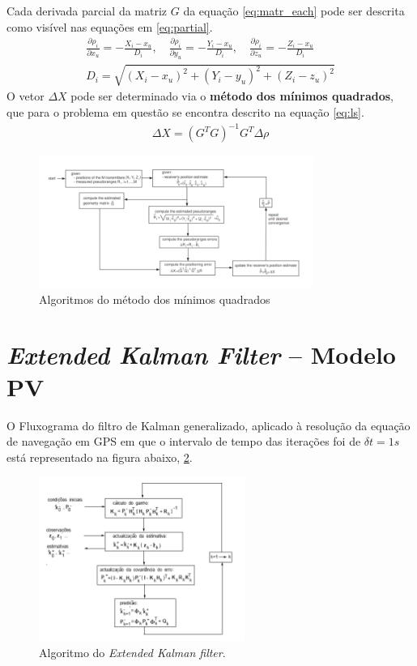 \documentclass[palatino]{ist-report}
\begin{document}
Cada derivada parcial da matriz $G$ da equação \ref{eq:matr_each} pode ser descrita como visível nas equações em \ref{eq:partial}.
\begin{subequations}
\begin{gather}\label{eq:partial}
    \frac{\partial\rho_i}{\partial x_u} = -\frac{X_i - x_u}{D_i}, \quad \frac{\partial\rho_i}{\partial y_u} = -\frac{Y_i - x_u}{D_i}, \quad \frac{\partial\rho_i}{\partial z_u} = -\frac{Z_i - x_u}{D_i} \\
    D_i = \sqrt{(X_i - x_u)^2 + (Y_i - y_u)^2 + (Z_i - z_u)^2}
\end{gather}
\end{subequations}
O vetor $\Delta X$ pode ser determinado via o \textbf{método dos mínimos quadrados}, que para o problema em questão se encontra descrito na equação \ref{eq:ls}.
\begin{gather*}\label{eq:ls}
    \Delta X = \left(G^TG\right)^{-1}G^T\Delta\rho
\end{gather*}


\begin{figure}[ht]
	\centering
	\includegraphics[width=0.8\textwidth]{graphics/minimosquadrados.png}
	\caption{Algoritmos do método dos mínimos quadrados}
	\label{LS}
\end{figure}




\section{\textit{Extended Kalman Filter} -- Modelo PV}

O Fluxograma do filtro de Kalman generalizado, aplicado à resolução da equação de navegação em GPS em que o intervalo de tempo das iterações foi de $ \delta t = 1 s$ está representado na figura abaixo, \ref{kalman}.


\begin{figure}[ht]
	\centering
	\includegraphics[width=0.6\textwidth]{graphics/kalman.png}
	\caption{Algoritmo do \textit{Extended Kalman filter}.}
	\label{kalman}
\end{figure}
\end{document}
